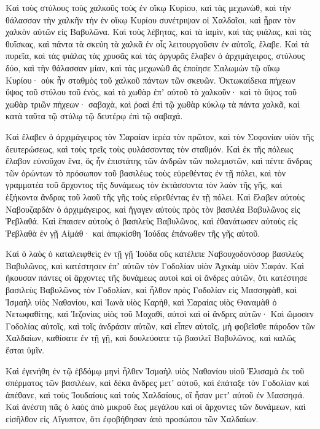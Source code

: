 {\par }{\PP {}Καὶ τοὺς στύλους τοὺς χαλκοῦς τοὺς ἐν οἴκῳ Κυρίου, καὶ τὰς μεχωνὼθ, καὶ τὴν θάλασσαν τὴν χαλκῆν τὴν ἐν οἴκῳ Κυρίου συνέτριψαν οἱ Χαλδαῖοι, καὶ ᾖραν τὸν χαλκὸν αὐτῶν εἰς Βαβυλῶνα.
Καὶ τοὺς λέβητας, καὶ τὰ ἰαμὶν, καὶ τὰς φιάλας, καὶ τὰς θυΐσκας, καὶ πάντα τὰ σκεύη τὰ χαλκᾶ ἐν οἷς λειτουργοῦσιν ἐν αὐτοῖς, ἔλαβε.
Καὶ τὰ πυρεῖα, καὶ τὰς φιάλας τὰς χρυσᾶς καὶ τὰς ἀργυρᾶς ἔλαβεν ὁ ἀρχιμάγειρος,
στύλους δύο, καὶ τὴν θάλασσαν μίαν, καὶ τὰς μεχωνὼθ ἃς ἐποίησε Σαλωμὼν τῷ οἴκῳ Κυρίου· οὐκ ἦν σταθμὸς τοῦ χαλκοῦ πάντων τῶν σκευῶν.
Ὀκτωκαίδεκα πήχεων ὕψος τοῦ στύλου τοῦ ἑνὸς, καὶ τὸ χωθὰρ ἐπʼ αὐτοῦ τὸ χαλκοῦν· καὶ τὸ ὕψος τοῦ χωθὰρ τριῶν πήχεων· σαβαχὰ, καὶ ῥοαὶ ἐπὶ τῷ χωθὰρ κύκλῳ τὰ πάντα χαλκᾶ, καὶ κατὰ ταῦτα τῷ στύλῳ τῷ δευτέρῳ ἐπὶ τῷ σαβαχά.
\par }{\PP {}Καὶ ἔλαβεν ὁ ἀρχιμάγειρος τὸν Σαραίαν ἱερέα τὸν πρῶτον, καὶ τὸν Σοφονίαν υἱὸν τῆς δευτερώσεως, καὶ τοὺς τρεῖς τοὺς φυλάσσοντας τὸν σταθμόν.
Καὶ ἐκ τῆς πόλεως ἔλαβον εὐνοῦχον ἕνα, ὅς ἦν ἐπιστάτης τῶν ἀνδρῶν τῶν πολεμιστῶν, καὶ πέντε ἄνδρας τῶν ὁρώντων τὸ πρόσωπον τοῦ βασιλέως τοὺς εὑρεθέντας ἐν τῇ πόλει, καὶ τὸν γραμματέα τοῦ ἄρχοντος τῆς δυνάμεως τὸν ἐκτάσσοντα τὸν λαὸν τῆς γῆς, καὶ ἑξήκοντα ἄνδρας τοῦ λαοῦ τῆς γῆς τοὺς εὑρεθέντας ἐν τῇ πόλει.
Καὶ ἔλαβεν αὐτοὺς Ναβουζαρδὰν ὁ ἀρχιμάγειρος, καὶ ἤγαγεν αὐτοὺς πρὸς τὸν βασιλέα Βαβυλῶνος εἰς Ῥεβλαθά.
Καὶ ἔπαισεν αὐτοὺς ὁ βασιλεὺς Βαβυλῶνος, καὶ ἐθανάτωσεν αὐτοὺς εἰς Ῥεβλαθὰ ἐν γῇ Αἰμάθ· καὶ ἀπῳκίσθη Ἰούδας ἐπάνωθεν τῆς γῆς αὐτοῦ.
\par }{\PP {}Καὶ ὁ λαὸς ὁ καταλειφθεὶς ἐν τῇ γῇ Ἰούδα οὓς κατέλιπε Ναβουχοδονόσορ βασιλεὺς Βαβυλῶνος, καὶ κατέστησεν ἐπʼ αὐτῶν τὸν Γοδολίαν υἱὸν Ἀχικὰμ υἱὸν Σαφάν.
Καὶ ἤκουσαν πάντες οἱ ἄρχοντες τῆς δυνάμεως αυτοὶ καὶ οἱ ἄνδρες αὐτῶν, ὅτι κατέστησε βασιλεὺς Βαβυλῶνος τὸν Γοδολίαν, καὶ ἦλθον πρὸς Γοδολίαν εἰς Μασσηφὰθ, καὶ Ἰσμαὴλ υἱὸς Ναθανίου, καὶ Ἰωνὰ υἱὸς Καρὴθ, καὶ Σαραίας υἱὸς Θαναμὰθ ὁ Νετωφαθίτης, καὶ Ἰεζονίας υἱὸς τοῦ Μαχαθὶ, αὐτοὶ καὶ οἱ ἄνδρες αὐτῶν·
Καὶ ὤμοσεν Γοδολίας αὐτοῖς, καὶ τοῖς ἀνδράσιν αὐτῶν, καὶ εἶπεν αὐτοῖς, μὴ φοβεῖσθε πάροδον τῶν Χαλδαίων, καθίσατε ἐν τῇ γῇ, καὶ δουλεύσατε τῷ βασιλεῖ Βαβυλῶνος, καὶ καλῶς ἔσται ὑμῖν.
\par }{\PP {}Καὶ ἐγενήθη ἐν τῷ ἑβδόμῳ μηνὶ ἦλθεν Ἰσμαὴλ υἱὸς Ναθανίου υἱοῦ Ἐλισαμὰ ἐκ τοῦ σπέρματος τῶν βασιλέων, καὶ δέκα ἄνδρες μετʼ αὐτοῦ, καὶ ἐπάταξε τὸν Γοδολίαν καὶ ἀπέθανε, καὶ τοὺς Ἰουδαίους καὶ τοὺς Χαλδαίους, οἳ ἦσαν μετʼ αὐτοῦ ἐν Μασσηφά.
Καὶ ἀνέστη πᾶς ὁ λαὸς ἀπὸ μικροῦ ἕως μεγάλου καὶ οἱ ἄρχοντες τῶν δυνάμεων, καὶ εἰσῆλθον εἰς Αἴγυπτον, ὅτι ἐφοβήθησαν ἀπὸ προσώπου τῶν Χαλδαίων.
}

